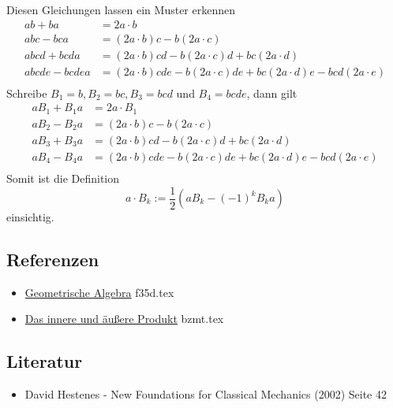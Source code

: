 \documentclass{sajzk}
\begin{document}
Diesen Gleichungen lassen ein Muster erkennen
\begin{align*}
  ab + ba &= 2a\cdot b \\
  abc - bca &= (2a\cdot b)c - b(2a\cdot c) \\
  abcd + bcda &= (2a\cdot b)cd - b(2a\cdot c)d + bc(2a\cdot d) \\
  abcde - bcdea &= (2a\cdot b)cde - b(2a\cdot c)de + bc(2a\cdot d)e - bcd(2a\cdot e) \\
\end{align*}
Schreibe $B_1 = b, B_2 = bc, B_3 = bcd$ und $B_4 = bcde$, dann gilt
\begin{align*}
  aB_1 + B_1a &= 2a\cdot B_1 \\
  aB_2 - B_2a &= (2a\cdot b)c - b(2a\cdot c) \\
  aB_3 + B_3a &= (2a\cdot b)cd - b(2a\cdot c)d + bc(2a\cdot d) \\
  aB_4 - B_4a &= (2a\cdot b)cde - b(2a\cdot c)de + bc(2a\cdot d)e - bcd(2a\cdot e) \\
\end{align*}
Somit ist die Definition
$$a\cdot B_k :=\frac{1}{2}(aB_k - (-1)^kB_ka)$$
einsichtig.

\subsection{Referenzen} 
\begin{itemize}
    \item \href{f35d.pdf}{Geometrische Algebra} f35d.tex
    \item \href{bzmt.pdf}{Das innere und äußere Produkt} bzmt.tex
\end{itemize}

\subsection{Literatur} 
\begin{itemize}
    \item David Hestenes - New Foundations for Classical Mechanics (2002) Seite 42
\end{itemize}
\end{document}
